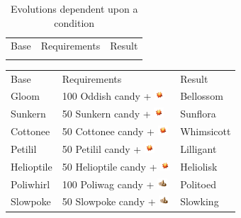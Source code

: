 \begin{table}[ht]
\footnotesize
\begin{center}
  \begin{tabular}{lll}
    Base & Requirements & Result \\
    \Midrule
  \end{tabular}
\end{center}
\caption{Evolutions dependent upon a condition}
\label{table:condevolutions}
\end{table}

\begin{table}[ht]
\footnotesize
\begin{center}
  \begin{tabular}{lll}
    Base & Requirements & Result \\
    \Midrule
    Gloom & 100 Oddish candy + \includegraphics[width=1em,height=1em]{images/sunstone.png} & Bellossom \\
    Sunkern & 50 Sunkern candy + \includegraphics[width=1em,height=1em]{images/sunstone.png} & Sunflora \\
    Cottonee & 50 Cottonee candy + \includegraphics[width=1em,height=1em]{images/sunstone.png} & Whimsicott \\
    Petilil & 50 Petilil candy + \includegraphics[width=1em,height=1em]{images/sunstone.png} & Lilligant \\
    Helioptile & 50 Helioptile candy + \includegraphics[width=1em,height=1em]{images/sunstone.png} & Heliolisk \\
    Poliwhirl & 100 Poliwag candy + \includegraphics[width=1em,height=1em]{images/kingsrock.png} & Politoed \\
    Slowpoke & 50 Slowpoke candy + \includegraphics[width=1em,height=1em]{images/kingsrock.png} & Slowking \\

\end{tabular}
\end{center}
\end{table}

